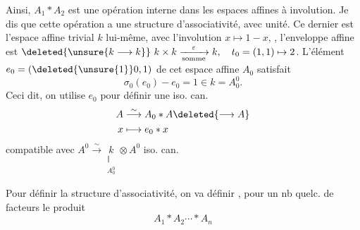 Ainsi, $A_1\ast A_2$ est une opération interne dans les espaces affines à involution. Je dis que cette opération a une structure d'associativité, avec  unité.
Ce dernier est l'espace affine trivial $k$ lui-même, avec l'involution $x\longmapsto1-x$,  , l'enveloppe affine est $\deleted{\unsure{k\longrightarrow k}}\ k\times k\xrightarrow[\text{somme}]{\varepsilon}k,\quad t_0=(1,1)\mapsto2$.
L'élément $e_0=(\deleted{\unsure{1}}0,1)$ de cet espace affine $A_0$ satisfait
\[
 \sigma_0(e_0)-e_0=1\in k=A_0^0.
\]
Ceci dit, on utilise $e_0$ pour définir une iso. can.
\[
 \begin{aligned}
 A&\overset{\sim}{\longrightarrow} A_0\ast A\deleted{\longrightarrow A}\\
 x&\longmapsto e_0\ast x
 \end{aligned}
\]
compatible avec $A^0\overset{\sim}{\longrightarrow}\underset{\substack{\Vert\\A_0^0}}{k}\otimes A^0$ iso. can.

Pour définir la structure d'associativité, on va définir , pour un nb quelc. de facteurs  le produit
\[
 A_1\ast A_2\cdots\ast A_n
\]

